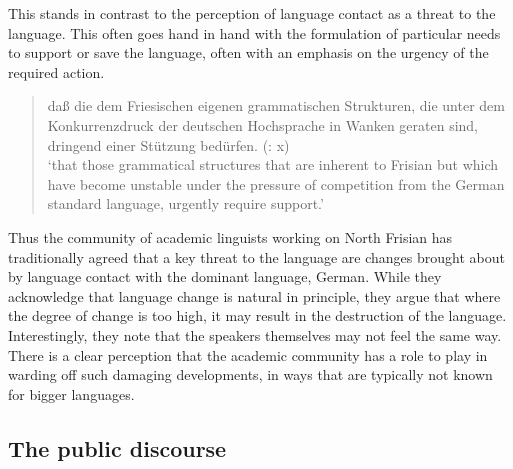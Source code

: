 \documentclass[output=paper]{langsci/langscibook}
\begin{document}
This stands in contrast to the perception of language contact as a threat to the language. This often goes hand in hand with the formulation of particular needs to support or save the language, often with an emphasis on the urgency of the required action. 

\begin{quote}\sloppy
daß die dem Friesischen eigenen grammatischen Strukturen, die unter dem Konkurrenzdruck der deutschen Hochsprache in Wanken geraten sind, dringend einer Stützung bedürfen. (\citealt{WiltsEtAl1986}: x)\smallskip\\\relax
‘that those grammatical structures that are inherent to Frisian but which have become unstable under the pressure of competition from the German standard language, urgently require support.’
\end{quote}

Thus the community of academic linguists working on North Frisian has traditionally agreed that a key threat to the language are changes brought about by language contact with the dominant language, German. While they acknowledge that language change is natural in principle, they argue that where the degree of change is too high, it may result in the destruction of the language. Interestingly, they note that the speakers themselves may not feel the same way. There is a clear perception that the academic community has a role to play in warding off such damaging developments, in ways that are typically not known for bigger languages.

\subsection{The public discourse}
\label{sec:gregersen:5.2}
\end{document}
